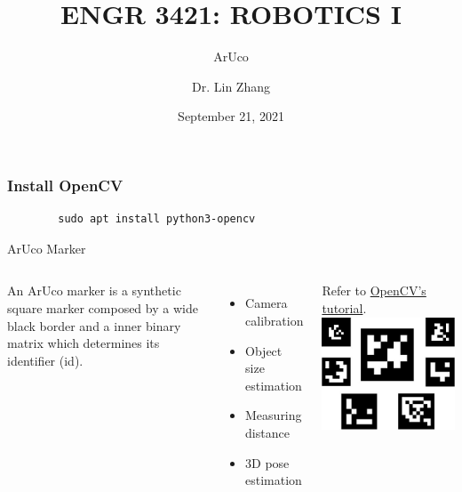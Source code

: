 \documentclass[12pt,letterpaper]{beamer}
\title[Robotics I]
{ENGR 3421: ROBOTICS I}
\subtitle{ArUco}
\author[Zhang, Lin]
{Dr. Lin Zhang}
\institute[UCA] %
{
  Department of Physics and Astronomy\\
  University of Central Arkansas
}
\date[Robotics1 2021] %
{September 21, 2021}
\begin{document}
\frame{\titlepage}



\begin{frame}[fragile]
\frametitle{Install OpenCV}
    \begin{verbatim}
        sudo apt install python3-opencv
    \end{verbatim}
\end{frame}

\begin{frame}{ArUco Marker}
    \begin{columns}
        An ArUco marker is a synthetic square marker composed by a wide black border and a inner binary matrix which determines its identifier (id). 
        {\scriptsize
            \begin{itemize}
                \item Camera calibration
                \item Object size estimation
                \item Measuring distance
                \item 3D pose estimation
            \end{itemize}
        }
        Refer to \href{https://docs.opencv.org/4.5.2/d5/dae/tutorial_aruco_detection.html}{OpenCV's tutorial}.
        \includegraphics[width=0.8\linewidth]{aruco_markers}
    \end{columns}
\end{frame}
\end{document}
